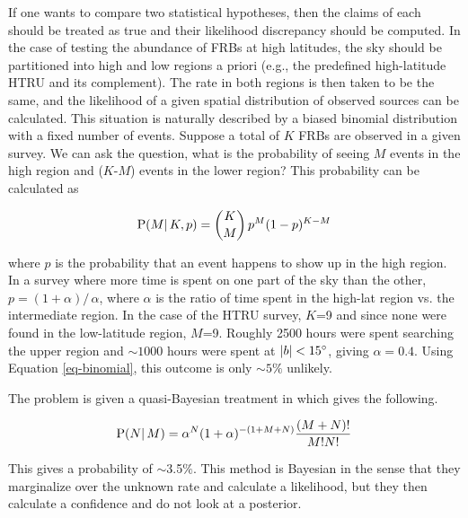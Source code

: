 \documentclass[useAMS,usenatbib]{mn2e}
\begin{document}
If one wants to 
compare two statistical hypotheses, then the claims of each should 
be treated as true and their likelihood discrepancy should be computed.
In the case of testing the abundance of FRBs at high latitudes,
the sky should be partitioned into high and low regions a priori 
(e.g., the predefined high-latitude HTRU and its complement). The rate in both regions 
is then taken to be the same, and the likelihood of a given spatial distribution of observed
sources can be calculated. This situation is naturally
described by a biased binomial distribution with a fixed number of events. Suppose
a total of $K$ FRBs are observed in a given survey. We can ask the question, what is the probability of 
seeing $M$ events in the high region and ($K$-$M$) events in the lower region?
This probability can be calculated %
as 

\begin{equation}
\label{eq-binomial}
\textup{P}(M | \, {K}, p) =  \binom{K}{M} \, p^{M} (1-p)^{K-M} 
\end{equation}

\noindent where $p$ is the probability that an event happens to show up in the 
high region. In a survey where more time is spent on one part of the 
sky than the other, $p=(1 + \alpha)/\, \alpha$, where $\alpha$ is the ratio of 
time spent in the high-lat region vs. the intermediate region. In the case of the HTRU 
survey, $K$=9 and since none were found 
in the low-latitude region, $M$=9. Roughly 2500 hours were spent searching the upper region
and $\sim1000$ hours were spent at $|b| < 15\degree$, giving $\alpha=0.4$. Using Equation 
\ref{eq-binomial}, this outcome is only $\sim5\%$ unlikely. 

The problem is given a quasi-Bayesian treatment in 
\cite{2014ApJ...789L..26P} which gives the following.

\begin{equation}
\label{eq-petroff}
\textup{P}(N | \,M) =  \alpha^{N} (1 + \alpha)^{-(1+M+N)} \frac{(M+N)!}{M!N!}
\end{equation}

\noindent This gives a probability of $\sim$3.5$\%$. This method 
is Bayesian in the sense that they marginalize over the unknown rate 
and calculate a likelihood, but they then calculate a confidence 
and do not look at a posterior.  

\end{document}
